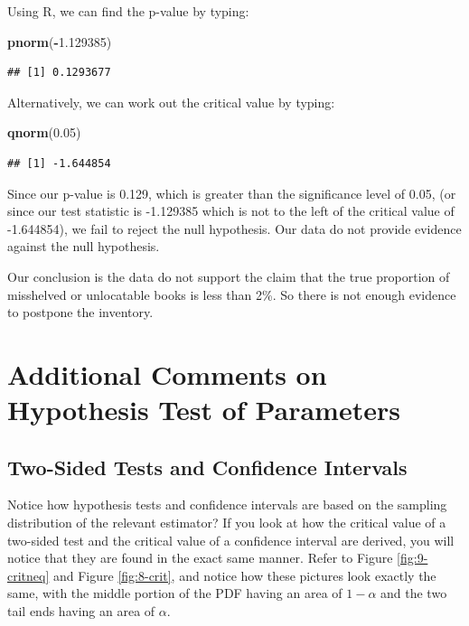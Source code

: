 \documentclass[
]{book}
\newenvironment{Shaded}{\begin{snugshade}}{\end{snugshade}}
\newcommand{\FloatTok}[1]{\textcolor[rgb]{0.00,0.00,0.81}{#1}}
\newcommand{\FunctionTok}[1]{\textcolor[rgb]{0.13,0.29,0.53}{\textbf{#1}}}
\newcommand{\NormalTok}[1]{#1}
\newcommand{\SpecialCharTok}[1]{\textcolor[rgb]{0.81,0.36,0.00}{\textbf{#1}}}
\begin{document}
Using R, we can find the p-value by typing:

\begin{Shaded}
\begin{Highlighting}[]
\FunctionTok{pnorm}\NormalTok{(}\SpecialCharTok{{-}}\FloatTok{1.129385}\NormalTok{)}
\end{Highlighting}
\end{Shaded}

\begin{verbatim}
## [1] 0.1293677
\end{verbatim}

Alternatively, we can work out the critical value by typing:

\begin{Shaded}
\begin{Highlighting}[]
\FunctionTok{qnorm}\NormalTok{(}\FloatTok{0.05}\NormalTok{)}
\end{Highlighting}
\end{Shaded}

\begin{verbatim}
## [1] -1.644854
\end{verbatim}

Since our p-value is 0.129, which is greater than the significance level of 0.05, (or since our test statistic is -1.129385 which is not to the left of the critical value of -1.644854), we fail to reject the null hypothesis. Our data do not provide evidence against the null hypothesis.

Our conclusion is the data do not support the claim that the true proportion of misshelved or unlocatable books is less than 2\%. So there is not enough evidence to postpone the inventory.

\section{Additional Comments on Hypothesis Test of Parameters}\label{additional-comments-on-hypothesis-test-of-parameters}

\subsection{Two-Sided Tests and Confidence Intervals}\label{inference}

Notice how hypothesis tests and confidence intervals are based on the sampling distribution of the relevant estimator? If you look at how the critical value of a two-sided test and the critical value of a confidence interval are derived, you will notice that they are found in the exact same manner. Refer to Figure \ref{fig:9-critneq} and Figure \ref{fig:8-crit}, and notice how these pictures look exactly the same, with the middle portion of the PDF having an area of \(1-\alpha\) and the two tail ends having an area of \(\alpha\).
\end{document}
